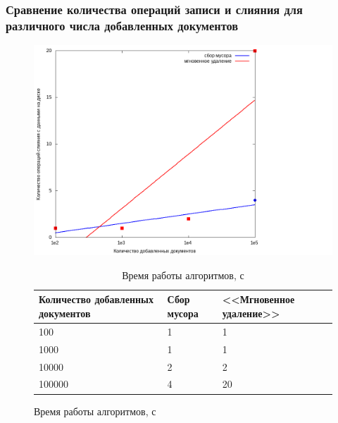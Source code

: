 \documentclass[aspectratio=169, pdf, 8pt, unicode]{beamer}
\begin{document}
\begin{frame}[fragile]
\frametitle{Сравнение количества операций записи и слияния для различного числа добавленных документов}
\begin{figure}[H]
\centering
\begin{minipage}[h]{0.55\linewidth}
\includegraphics[width=1\textwidth]{fig/merges.png}
\caption{Зависимость количества слияний с диском от количества добавленных документов}
\end{minipage}
\hfil
\begin{minipage}[h]{0.35\linewidth}
\begin{table}[H]
      \caption{Время работы алгоритмов, с}
      \centering
      \small
      \singlespacing
      \begin{tabular}{|p{1.5cm}|p{1.5cm}|p{1.5cm}|}
        \hline
        Количество добавленных документов   & Сбор мусора                 & <<Мгновенное удаление>>     \\ \hline \hline
            100                                 & 1                           & 1                           \\ \hline
            1000                                & 1                           & 1                           \\ \hline
            10000                               & 2                           & 2                           \\ \hline
            100000                              & 4                           & 20                          \\ \hline
\end{tabular}
\end{table}
\end{minipage}
\end{figure}
\end{frame}
\end{document}

